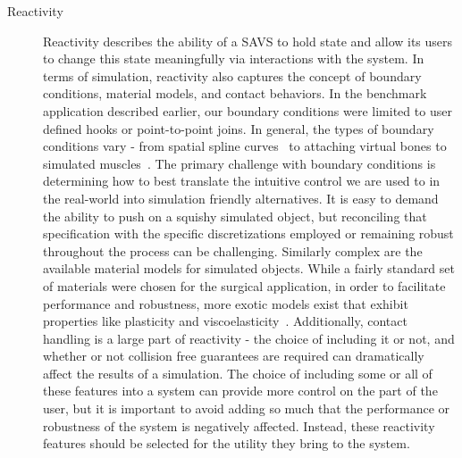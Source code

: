 \begin{description}
\item[Reactivity] Reactivity describes the ability of a SAVS to hold
  state and allow its users to change this state meaningfully via
  interactions with the system. In terms of simulation, reactivity
  also captures the concept of boundary conditions, material models,
  and contact behaviors. In the benchmark application described
  earlier, our boundary conditions were limited to user defined hooks
  or point-to-point joins. In general, the types of boundary
  conditions vary - from spatial spline curves~\citep{SetalWMKS:2014}
  to attaching virtual bones to simulated muscles~\citep{PatteMS:2012,MitchCS:2015}. The
  primary challenge with boundary conditions is determining how to
  best translate the intuitive control we are used to in the
  real-world into simulation friendly alternatives. It is easy to
  demand the ability to push on a squishy simulated object, but
  reconciling that specification with the specific discretizations
  employed or remaining robust throughout the process can be
  challenging. Similarly complex are the available material models for
  simulated objects. While a fairly standard set of materials were
  chosen for the surgical application, in order to facilitate
  performance and robustness, more exotic models exist that exhibit
  properties like plasticity and
  viscoelasticity~\citep{WojtaT:2008}. Additionally, contact handling
  is a large part of reactivity - the choice of including it or not,
  and whether or not collision free guarantees are required can
  dramatically affect the results of a simulation. The choice of
  including some or all of these features into a system can provide
  more control on the part of the user, but it is important to avoid
  adding so much that the performance or robustness of the system is
  negatively affected. Instead, these reactivity features should be
  selected for the utility they bring to the system.

  

\end{description}
